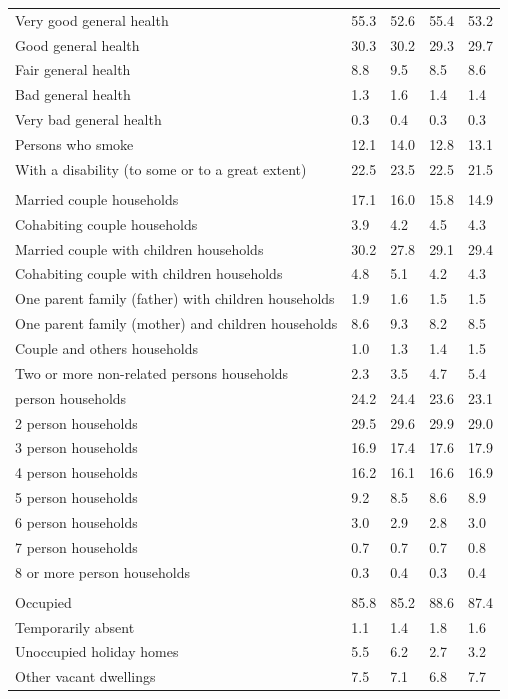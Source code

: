 \documentclass{article}
\begin{document}
\begin{table}[h]
\begin{tabular}{KTTTT}
    \hline
Very good general health & 55.3& 52.6&55.4& 53.2\\
Good general health & 30.3& 30.2& 29.3& 29.7\\
Fair general health & 8.8& 9.5&8.5& 8.6\\
Bad general health & 1.3& 1.6&1.4& 1.4\\
Very bad general health & 0.3& 0.4&0.3& 0.3\\
    \hline
Persons who smoke & 12.1& 14.0&12.8& 13.1\\
    \hline
With a disability (to some or to a great extent) & 22.5& 23.5&22.5& 21.5\\
\hline
    \\ 
    \hline
Married couple households & 17.1& 16.0& 15.8& 14.9\\
Cohabiting couple households & 3.9& 4.2& 4.5& 4.3\\
Married couple with children households & 30.2& 27.8& 29.1& 29.4\\
Cohabiting couple with children households & 4.8& 5.1& 4.2& 4.3\\
One parent family (father) with  children households & 1.9& 1.6& 1.5& 1.5\\
One parent family (mother) and children households & 8.6& 9.3& 8.2& 8.5\\
Couple and others households  & 1.0& 1.3& 1.4& 1.5\\
Two or more non-related persons households & 2.3& 3.5& 4.7& 5.4\\
     person households & 24.2& 24.4& 23.6& 23.1\\
2 person households & 29.5& 29.6& 29.9& 29.0\\
3 person households & 16.9& 17.4& 17.6& 17.9\\
4 person households & 16.2& 16.1& 16.6& 16.9\\
5 person households & 9.2& 8.5& 8.6& 8.9\\
6 person households & 3.0& 2.9& 2.8& 3.0\\
7 person households & 0.7& 0.7& 0.7& 0.8\\
8 or more person households & 0.3& 0.4& 0.3& 0.4\\
\hline
    \\ 
    \hline
Occupied & 85.8& 85.2& 88.6& 87.4\\
Temporarily absent & 1.1& 1.4& 1.8& 1.6\\
Unoccupied holiday homes & 5.5& 6.2& 2.7& 3.2\\
Other vacant dwellings & 7.5& 7.1& 6.8& 7.7\\
\hline
\end{tabular}
\end{table}
\end{document}
